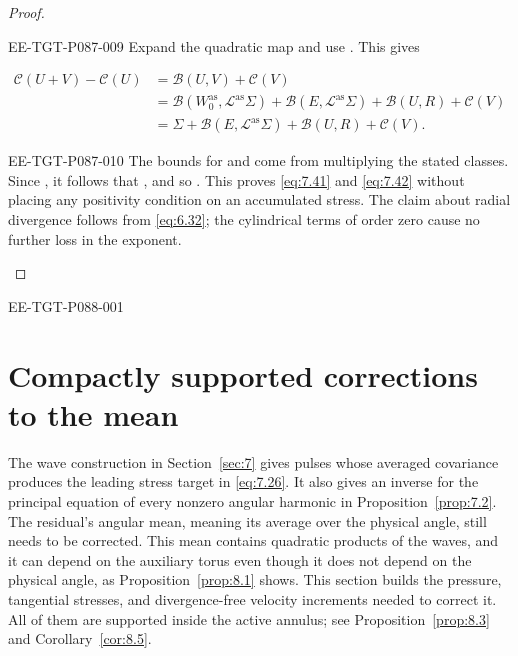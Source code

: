 \begin{proof}
\begin{EESegment}{EE-TGT-P087-009}
Expand the quadratic map and use
. This gives
\end{EESegment}
\begin{align*}
  \mathcal C(U+V)-\mathcal C(U)
    &=\mathcal B(U,V)+\mathcal C(V)\\
    &=\mathcal B(W_0^{\mathrm{as}},\mathcal L^{\mathrm{as}}\Sigma)
      +\mathcal B(E,\mathcal L^{\mathrm{as}}\Sigma)+\mathcal B(U,R)+\mathcal C(V)\\
    &=\Sigma+\mathcal B(E,\mathcal L^{\mathrm{as}}\Sigma)
      +\mathcal B(U,R)+\mathcal C(V).
\end{align*}
\begin{EESegment}{EE-TGT-P087-010}
The bounds for  and
 come from multiplying the stated classes. Since
, it follows that
, and so
. This proves \eqref{eq:7.41}
and \eqref{eq:7.42} without placing any positivity condition %
on an accumulated stress. The claim
about radial divergence follows from \eqref{eq:6.32}; the cylindrical terms of order zero cause no
further loss in the exponent.
\end{EESegment}
\end{proof}

\begin{EESegment}{EE-TGT-P088-001}
\section{Compactly supported corrections to the mean}\label{sec:8}
The wave construction in Section~\ref{sec:7} gives pulses whose averaged covariance produces the
leading stress target in \eqref{eq:7.26}. It also gives an inverse for the principal equation of every
nonzero angular harmonic in Proposition~\ref{prop:7.2}. The residual's angular mean, meaning its
average over the physical angle, still needs to be corrected. This mean contains quadratic products
of the waves, and it can depend on the auxiliary torus even though it does not depend on the physical
angle, as Proposition~\ref{prop:8.1} shows. This section builds the pressure, tangential stresses, and
divergence-free velocity increments needed to correct it. All of them are supported inside the active
annulus; see Proposition~\ref{prop:8.3} and Corollary~\ref{cor:8.5}.
\end{EESegment}

